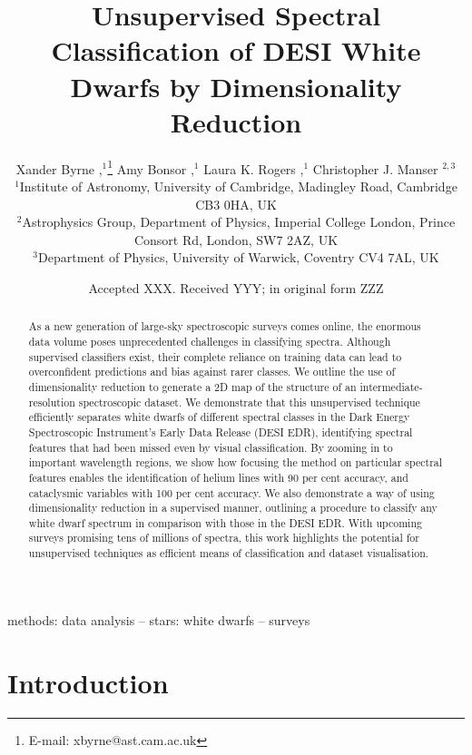 \documentclass[fleqn,usenatbib]{mnras}
\title[
    Unsupervised WD Spectral Classification
]{
    Unsupervised Spectral Classification of DESI White Dwarfs by Dimensionality Reduction
}
\author[
    X. Byrne et al.
]{
    Xander Byrne
    \orcidlink{0000-0001-9488-238X},$^{1}$\thanks{E-mail: xbyrne@ast.cam.ac.uk}
    Amy Bonsor
    \orcidlink{0000-0002-8070-1901},$^{1}$
    Laura K. Rogers
    \orcidlink{0000-0002-3553-9474},$^{1}$
    Christopher J. Manser
    \orcidlink{0000-0003-1543-5405}$^{2,3}$
\\
$^{1}$Institute of Astronomy,
University of Cambridge,
Madingley Road,
Cambridge CB3 0HA,
UK\\
$^{2}$Astrophysics Group,
Department of Physics,
Imperial College London,
Prince Consort Rd,
London,
SW7 2AZ,
UK\\
$^{3}$Department of Physics,
University of Warwick,
Coventry CV4 7AL,
UK
}
\date{Accepted XXX. Received YYY; in original form ZZZ}
\begin{document}
\label{firstpage}
\pagerange{\pageref{firstpage}--\pageref{lastpage}}
\maketitle

\begin{abstract}
As a new generation of large-sky spectroscopic surveys comes online, the enormous data volume poses unprecedented challenges in classifying spectra.
Although supervised classifiers exist, their complete reliance on training data can lead to overconfident predictions and bias against rarer classes.
We outline the use of dimensionality reduction to generate a 2D map of the structure of an intermediate-resolution spectroscopic dataset.
We demonstrate that this unsupervised technique efficiently separates white dwarfs of different spectral classes in the Dark Energy Spectroscopic Instrument's Early Data Release (DESI EDR), identifying spectral features that had been missed even by visual classification.
By zooming in to important wavelength regions, we show how focusing the method on particular spectral features enables the identification of helium lines with 90 per cent accuracy, and cataclysmic variables with 100 per cent accuracy.
We also demonstrate a way of using dimensionality reduction in a supervised manner, outlining a procedure to classify any white dwarf spectrum in comparison with those in the DESI EDR.
With upcoming surveys promising tens of millions of spectra, this work highlights the potential for unsupervised techniques as efficient means of classification and dataset visualisation.
\end{abstract}

\begin{keywords}
methods: data analysis -- stars: white dwarfs -- surveys
\end{keywords}



\section{Introduction}
\end{document}
